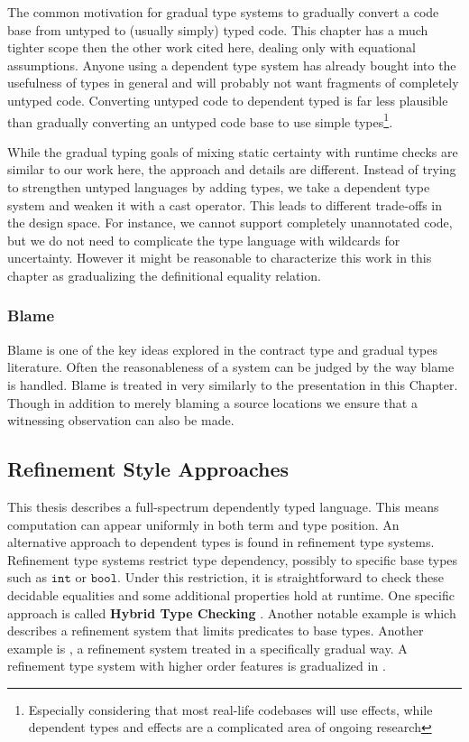 The common motivation for gradual type systems to gradually convert a code base from untyped to (usually simply) typed code.
This chapter has a much tighter scope then the other work cited here, dealing only with equational assumptions.
Anyone using a dependent type system has already bought into the usefulness of types in general and will probably not want fragments of completely untyped code.
Converting untyped code to dependent typed is far less plausible than gradually converting an untyped code base to use simple types\footnote{
  Especially considering that most real-life codebases will use effects, while dependent types and effects are a complicated area of ongoing research
  }.

While the gradual typing goals of mixing static certainty with runtime checks are similar to our work here, the approach and details are different.
Instead of trying to strengthen untyped languages by adding types, we take a dependent type system and weaken it with a cast operator.
This leads to different trade-offs in the design space.
For instance, we cannot support completely unannotated code, but we do not need to complicate the type language with wildcards for uncertainty.
However it might be reasonable to characterize this work in this chapter as gradualizing the definitional equality relation.

\subsubsection{Blame}

Blame is one of the key ideas explored in the contract type and gradual types literature\cite{10.1007/978-3-642-00590-9_1,wadler:LIPIcs:2015:5033,10.1145/3110283}.
Often the reasonableness of a system can be judged by the way blame is handled\cite{wadler:LIPIcs:2015:5033}.
Blame is treated in \cite{wadler:LIPIcs:2015:5033} very similarly to the presentation in this Chapter.
Though in addition to merely blaming a source locations we ensure that a witnessing observation can also be made.

\subsection{Refinement Style Approaches}

This thesis describes a full-spectrum dependently typed language.
This means computation can appear uniformly in both term and type position.
An alternative approach to dependent types is found in refinement type systems.
Refinement type systems restrict type dependency, possibly to specific base types such as $\mathtt{int}$ or $\mathtt{bool}$.
Under this restriction, it is straightforward to check these decidable equalities and some additional properties hold at runtime.
One specific approach is called \textbf{Hybrid Type Checking} \cite{10.1145/1111037.1111059}.
Another notable example is \cite{10.1007/1-4020-8141-3_34} which describes a refinement system that limits predicates to base types.
Another example is \cite{10.1145/3093333.3009856}, a refinement system treated in a specifically gradual way. A refinement type system with higher order features is gradualized in \cite{c4be73a0daf74c9aa4d13483a2c4dd0e}.

